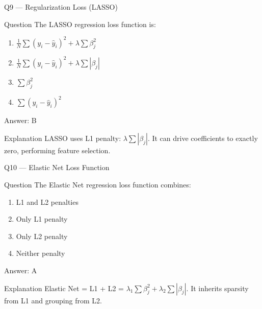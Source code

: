 \documentclass[aspectratio=169,8pt]{beamer}
\begin{document}
	\begin{frame}{Q9 --- Regularization Loss (LASSO)}
		\begin{block}{Question}
			The LASSO regression loss function is:
			\begin{enumerate}
				\item $\frac{1}{N}\sum (y_i - \hat{y}_i)^2 + \lambda \sum \beta_j^2$
				\item $\frac{1}{N}\sum (y_i - \hat{y}_i)^2 + \lambda \sum |\beta_j|$
				\item $\sum \beta_j^2$
				\item $\sum (y_i - \hat{y}_i)^2$
			\end{enumerate}
		\end{block}
		\begin{exampleblock}{Answer: B}\end{exampleblock}
		\begin{block}{Explanation}
			LASSO uses L1 penalty: $\lambda \sum |\beta_j|$. It can drive coefficients to exactly zero, performing feature selection.
		\end{block}
	\end{frame}
	
	\begin{frame}{Q10 --- Elastic Net Loss Function}
		\begin{block}{Question}
			The Elastic Net regression loss function combines:
			\begin{enumerate}
				\item L1 and L2 penalties
				\item Only L1 penalty
				\item Only L2 penalty
				\item Neither penalty
			\end{enumerate}
		\end{block}
		\begin{exampleblock}{Answer: A}\end{exampleblock}
		\begin{block}{Explanation}
			Elastic Net = L1 + L2 = $\lambda_1 \sum \beta_j^2 + \lambda_2 \sum |\beta_j|$. It inherits sparsity from L1 and grouping from L2.
		\end{block}
	\end{frame}
	
\end{document}
